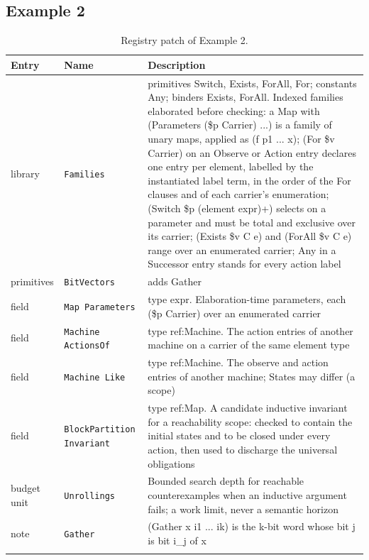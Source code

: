 \documentclass[11pt]{article}
\newcommand{\code}[1]{\texttt{#1}}
\theoremstyle{definition}
\theoremstyle{plain}
\begin{document}
\subsection{Example 2}
\begin{footnotesize}
\begin{longtable}{>{\raggedright\arraybackslash}p{2.2cm}>{\raggedright\arraybackslash}p{4.1cm}>{\raggedright\arraybackslash}p{7.9cm}}
\toprule
Entry & Name & Description\\
\midrule
\endhead
library & \code{Families} & primitives Switch, Exists, ForAll, For; constants Any; binders Exists, ForAll. Indexed families elaborated before checking:\allowbreak{} a Map with (Parameters (\$p Carrier) ...) is a family of unary maps, applied as (f p1 ... x); (For \$v Carrier) on an Observe or Action entry declares one entry per element, labelled by the instantiated label term, in the order of the For clauses and of each carrier's enumeration; (Switch \$p (element expr)+) selects on a parameter and must be total and exclusive over its carrier; (Exists \$v C e) and (ForAll \$v C e) range over an enumerated carrier; Any in a Successor entry stands for every action label\\
primitives & \code{BitVectors} & adds Gather\\
field & \code{Map Parameters} & type expr. Elaboration-time parameters, each (\$p Carrier) over an enumerated carrier\\
field & \code{Machine ActionsOf} & type ref:\allowbreak{}Machine. The action entries of another machine on a carrier of the same element type\\
field & \code{Machine Like} & type ref:\allowbreak{}Machine. The observe and action entries of another machine; States may differ (a scope)\\
field & \code{BlockPartition Invariant} & type ref:\allowbreak{}Map. A candidate inductive invariant for a reachability scope:\allowbreak{} checked to contain the initial states and to be closed under every action, then used to discharge the universal obligations\\
budget unit & \code{Unrollings} & Bounded search depth for reachable counterexamples when an inductive argument fails; a work limit, never a semantic horizon\\
note & \code{Gather} & (Gather x i1 ... ik) is the k-bit word whose bit j is bit i\_j of x\\
\bottomrule
\caption{Registry patch of Example 2.}
\end{longtable}
\end{footnotesize}
\end{document}
